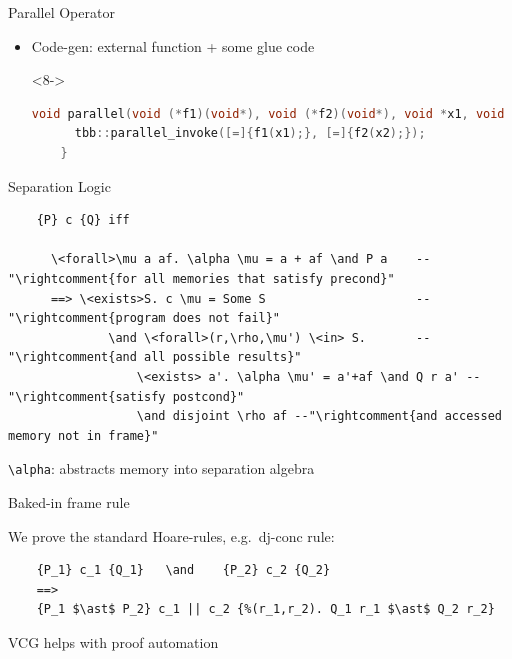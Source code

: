 \documentclass[fleqn]{beamer}
\begin{document}
\begin{frame}[t,fragile]{Parallel Operator}
\begin{itemize}
\begin{onlyenv}
\begin{itemize}
      \end{itemize}
    \end{onlyenv}
   \item<7-> Code-gen: external function + some glue code
    \begin{onlyenv}<8->
    \small
    \begin{lstlisting}[language=C++]
    void parallel(void (*f1)(void*), void (*f2)(void*), void *x1, void *x2) {
      tbb::parallel_invoke([=]{f1(x1);}, [=]{f2(x2);});
    }
    \end{lstlisting}
    \end{onlyenv}


  \end{itemize}
\end{frame}
\begin{frame}[fragile]{Separation Logic}
  \begin{lstlisting}
    {P} c {Q} iff

      \<forall>\mu a af. \alpha \mu = a + af \and P a    --"\rightcomment{for all memories that satisfy precond}"
      ==> \<exists>S. c \mu = Some S                     --"\rightcomment{program does not fail}"
              \and \<forall>(r,\rho,\mu') \<in> S.       --"\rightcomment{and all possible results}"
                  \<exists> a'. \alpha \mu' = a'+af \and Q r a' --"\rightcomment{satisfy postcond}"
                  \and disjoint \rho af --"\rightcomment{and accessed memory not in frame}"

  \end{lstlisting}

  \lstinline{\alpha}: abstracts memory into separation algebra

  Baked-in frame rule

  \pause
  We prove the standard Hoare-rules, e.g.\ dj-conc rule:
  \begin{lstlisting}
    {P_1} c_1 {Q_1}   \and    {P_2} c_2 {Q_2}
    ==>
    {P_1 $\ast$ P_2} c_1 || c_2 {%(r_1,r_2). Q_1 r_1 $\ast$ Q_2 r_2}
  \end{lstlisting}

  \pause
  VCG helps with proof automation

\end{frame}
\end{document}
